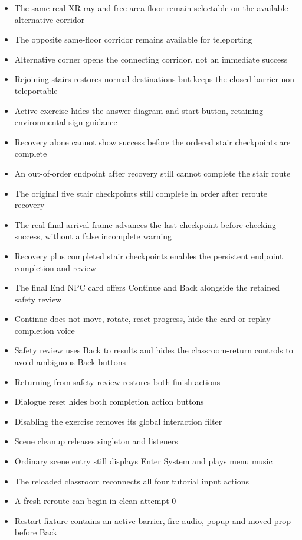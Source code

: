 \documentclass[12pt,a4paper]{article}
\begin{document}
\begin{itemize}[leftmargin=*,nosep]
\item The same real XR ray and free-area floor remain selectable on the available alternative corridor
\item The opposite same-floor corridor remains available for teleporting
\item Alternative corner opens the connecting corridor, not an immediate success
\item Rejoining stairs restores normal destinations but keeps the closed barrier non-teleportable
\item Active exercise hides the answer diagram and start button, retaining environmental-sign guidance
\item Recovery alone cannot show success before the ordered stair checkpoints are complete
\item An out-of-order endpoint after recovery still cannot complete the stair route
\item The original five stair checkpoints still complete in order after reroute recovery
\item The real final arrival frame advances the last checkpoint before checking success, without a false incomplete warning
\item Recovery plus completed stair checkpoints enables the persistent endpoint completion and review
\item The final End NPC card offers Continue and Back alongside the retained safety review
\item Continue does not move, rotate, reset progress, hide the card or replay completion voice
\item Safety review uses Back to results and hides the classroom-return controls to avoid ambiguous Back buttons
\item Returning from safety review restores both finish actions
\item Dialogue reset hides both completion action buttons
\item Disabling the exercise removes its global interaction filter
\item Scene cleanup releases singleton and listeners
\item Ordinary scene entry still displays Enter System and plays menu music
\item The reloaded classroom reconnects all four tutorial input actions
\item A fresh reroute can begin in clean attempt 0
\item Restart fixture contains an active barrier, fire audio, popup and moved prop before Back

\end{itemize}
\end{document}
